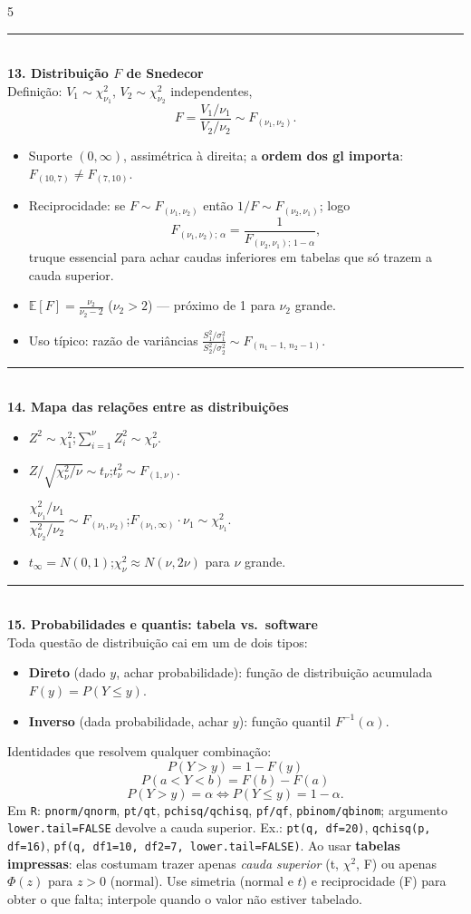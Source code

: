 \documentclass[a4paper,8pt]{extarticle}
\newcommand{\tit}[1]{\vspace{2pt}\textcolor{azul}{\rule{\linewidth}{0.6pt}}\\[1pt]\textbf{\textcolor{azul}{#1}}\\[1pt]}
\newcommand{\E}{\mathbb{E}}
\newcommand{\R}[1]{\texttt{\footnotesize #1}}
\begin{document}
\begin{multicols*}{5}
\tit{13. Distribuição $F$ de Snedecor}
Definição: $V_1\sim\chi^2_{\nu_1}$, $V_2\sim\chi^2_{\nu_2}$ independentes,
\[F=\frac{V_1/\nu_1}{V_2/\nu_2}\sim F_{(\nu_1,\nu_2)} .\]
\begin{itemize}
\item Suporte $(0,\infty)$, assimétrica à direita; a \textbf{ordem dos gl importa}: $F_{(10,7)}\ne F_{(7,10)}$.
\item Reciprocidade: se $F\sim F_{(\nu_1,\nu_2)}$ então $1/F\sim F_{(\nu_2,\nu_1)}$; logo
\[F_{(\nu_1,\nu_2);\,\alpha}=\frac{1}{F_{(\nu_2,\nu_1);\,1-\alpha}},\]
truque essencial para achar caudas inferiores em tabelas que só trazem a cauda superior.
\item $\E[F]=\frac{\nu_2}{\nu_2-2}$ ($\nu_2>2$) — próximo de 1 para $\nu_2$ grande.
\item Uso típico: razão de variâncias $\frac{S_1^2/\sigma_1^2}{S_2^2/\sigma_2^2}\sim F_{(n_1-1,\,n_2-1)}$.
\end{itemize}

\tit{14. Mapa das relações entre as distribuições}
\begin{itemize}
\item $Z^2\sim\chi^2_1$;\quad $\sum_{i=1}^{\nu}Z_i^2\sim\chi^2_\nu$.
\item $Z/\sqrt{\chi^2_\nu/\nu}\sim t_\nu$;\quad $t_\nu^2\sim F_{(1,\nu)}$.
\item $\dfrac{\chi^2_{\nu_1}/\nu_1}{\chi^2_{\nu_2}/\nu_2}\sim F_{(\nu_1,\nu_2)}$;\quad $F_{(\nu_1,\infty)}\cdot\nu_1\sim\chi^2_{\nu_1}$.
\item $t_\infty=N(0,1)$;\quad $\chi^2_\nu\approx N(\nu,2\nu)$ para $\nu$ grande.
\end{itemize}

\tit{15. Probabilidades e quantis: tabela vs.\ software}
Toda questão de distribuição cai em um de dois tipos:
\begin{itemize}
\item \textbf{Direto} (dado $y$, achar probabilidade): função de distribuição acumulada $F(y)=P(Y\le y)$.
\item \textbf{Inverso} (dada probabilidade, achar $y$): função quantil $F^{-1}(\alpha)$.
\end{itemize}
Identidades que resolvem qualquer combinação:
\[P(Y>y)=1-F(y)\]
\[P(a<Y<b)=F(b)-F(a)\]
\[P(Y>y)=\alpha \iff P(Y\le y)=1-\alpha .\]
Em \R{R}: \R{pnorm/qnorm}, \R{pt/qt}, \R{pchisq/qchisq}, \R{pf/qf}, \R{pbinom/qbinom}; argumento \R{lower.tail=FALSE} devolve a cauda superior. Ex.: \R{pt(q, df=20)}, \R{qchisq(p, df=16)}, \R{pf(q, df1=10, df2=7, lower.tail=FALSE)}.
Ao usar \textbf{tabelas impressas}: elas costumam trazer apenas \emph{cauda superior} (t, $\chi^2$, F) ou apenas $\Phi(z)$ para $z>0$ (normal). Use simetria (normal e $t$) e reciprocidade (F) para obter o que falta; interpole quando o valor não estiver tabelado.


\end{multicols*}
\end{document}
